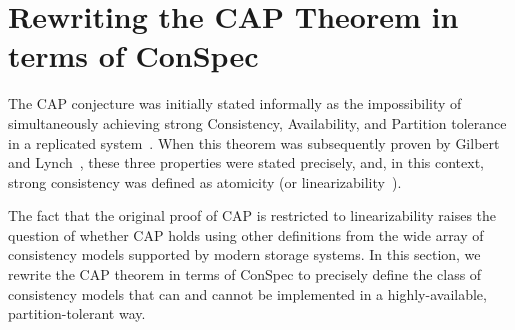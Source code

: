 \documentclass[journal,compsoc]{IEEEtran}
\begin{document}

 
\section{Rewriting the CAP Theorem in terms of ConSpec}\label{sec:cap}
The CAP conjecture was initially stated informally as the impossibility of simultaneously achieving strong Consistency, Availability, and Partition tolerance in a replicated system~\cite{brew:cap}. When this theorem was subsequently proven by Gilbert and Lynch~\cite{Gilbert:2002:BCF:564585.564601}, these three properties were stated precisely, and, in this context, strong consistency was defined as atomicity (or linearizability~\cite{Herlihy:1990:LCC:78969.78972}).

The fact that the original proof of CAP is restricted to linearizability raises the question of whether CAP holds using other definitions from
 the wide array of consistency models supported by modern storage systems.
 In this section, we rewrite the CAP theorem in terms of ConSpec to precisely define the class of consistency models that can and cannot be implemented in a highly-available, partition-tolerant way.
\end{document}
